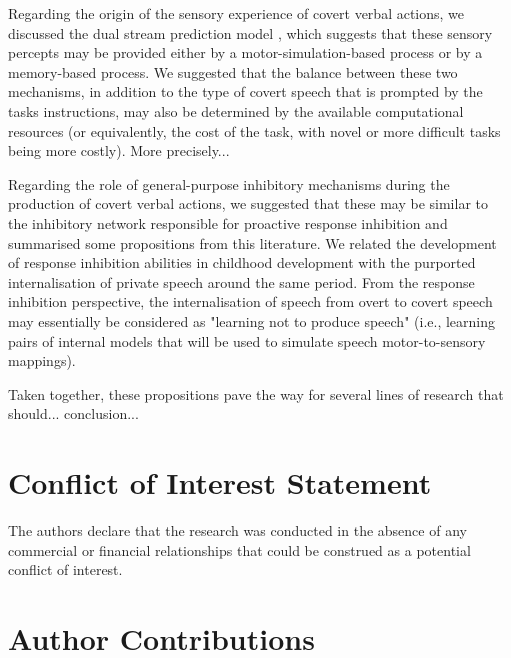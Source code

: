 \documentclass[utf8]{template/frontiersSCNS} %
\begin{document}
Regarding the origin of the sensory experience of covert verbal actions, we discussed the dual stream prediction model \citep{tian_mental_2012, tian_effect_2013, tian_mental_2016}, which suggests that these sensory percepts may be provided either by a motor-simulation-based process or by a memory-based process. We suggested that the balance between these two mechanisms, in addition to the type of covert speech that is prompted by the tasks instructions, may also be determined by the available computational resources (or equivalently, the cost of the task, with novel or more difficult tasks being more costly). More precisely...

Regarding the role of general-purpose inhibitory mechanisms during the production of covert verbal actions, we suggested that these may be similar to the inhibitory network responsible for proactive response inhibition and summarised some propositions from this literature. We related the development of response inhibition abilities in childhood development with the purported internalisation of private speech around the same period. From the response inhibition perspective, the internalisation of speech from overt to covert speech may essentially be considered as "learning not to produce speech" (i.e., learning pairs of internal models that will be used to simulate speech motor-to-sensory mappings).

Taken together, these propositions pave the way for several lines of research that should... conclusion...

\section*{Conflict of Interest Statement}


The authors declare that the research was conducted in the absence of any commercial or financial relationships that could be construed as a potential conflict of interest.

\section*{Author Contributions}

\color{blue}
\end{document}
